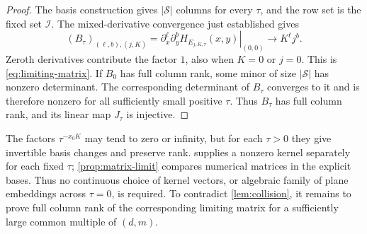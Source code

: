\begin{proof}
The basis construction gives $|\mathcal{S}|$ columns for every $\tau$, and the row set is the fixed set $\mathcal{I}$. The mixed-derivative convergence just established gives
\[
 (B_\tau)_{(\ell,b),(j,K)}
  =\left.\partial_x^\ell\partial_y^b
          H_{E_{j,K,\tau}}(x,y)\right|_{(0,0)}
  \longrightarrow K^\ell j^b.
\]
Zeroth derivatives contribute the factor $1$, also when $K=0$ or $j=0$. This is \eqref{eq:limiting-matrix}. If $B_0$ has full column rank, some minor of size $|\mathcal{S}|$ has nonzero determinant. The corresponding determinant of $B_\tau$ converges to it and is therefore nonzero for all sufficiently small positive $\tau$. Thus $B_\tau$ has full column rank, and its linear map $J_\tau$ is injective.
\end{proof}

The factors $\tau^{-x_0K}$ may tend to zero or infinity, but for each $\tau>0$ they give invertible basis changes and preserve rank.  supplies a nonzero kernel separately for each fixed $\tau$; \cref{prop:matrix-limit} compares numerical matrices in the explicit bases. Thus no continuous choice of kernel vectors, or algebraic family of plane embeddings across $\tau=0$, is required. To contradict \cref{lem:collision}, it remains to prove full column rank of the corresponding limiting matrix for a sufficiently large common multiple of $(d,m)$.
